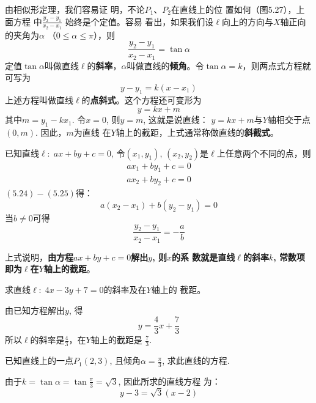 由相似形定理，我们容易证
明，不论$P_1$、$P_2$在直线上的位
置如何（图5.27），上面方程
中$\frac{y_2-y_1}{x_2-x_1}$
始终是个定值。容易
看出，如果我们设$\ell$向上的方向与$X$轴正向的夹角为$\alpha$
（$0\le \alpha\le \pi$），则
\[\frac{y_2-y_1}{x_2-x_1}=\tan\alpha\]
定值$\tan\alpha$叫做直线$\ell$的\textbf{斜率}，$\alpha$叫做直线的\textbf{倾角}。令$\tan\alpha=k$，则两点式方程就可写为
\[y-y_1=k(x-x_1)\]
上述方程叫做直线$\ell$的\textbf{点斜式}。这个方程还可变形为
\[y=kx+m\]
其中$m=y_1-kx_1$. 令$x=0$, 则$y=m$, 这就是说直线：
$y=kx+m$与$Y$轴相交于点$(0,m)$. 因此，$m$为直线
在$Y$轴上的截距，上式通常称做直线的\textbf{斜截式}。

已知直线$\ell:\; ax+by+c=0$, 令$(x_1,y_1)$, 
$(x_2,y_2)$是$\ell$上任意两个不同的点，则
\begin{align}
    ax_1+by_1+c=0\\
ax_2+by_2+c=0
\end{align}
$(5.24)-(5.25)$得：
\[a(x_2-x_1)+b(y_2-y_1)=0\]
当$b\ne 0$可得
\[\frac{y_2-y_1}{x_2-x_1}=-\frac{a}{b}\]

上式说明，\textbf{由方程$ax+by+c=0$解出$y$, 则$x$的系
数就是直线$\ell$的斜率$k$, 常数项即为$\ell$在$Y$轴上的截距}。

\begin{example}
    求直线$\ell:\; 4x-3y+7=0$的斜率及在$Y$轴上的
截距。
\end{example}


\begin{solution}
   由已知方程解出$y$, 得
\[y=\frac{4}{3}x+\frac{7}{3}\]
所以$\ell$的斜率是$\frac{4}{3}$，在$Y$轴上的截距是
$\frac{7}{3}$.
\end{solution}

\begin{example}
已知直线上的一点$P_1(2,3)$, 且倾角$\alpha=\frac{\pi}{3}$, 
求此直线的方程.
\end{example}

\begin{solution}
    由于$k=\tan\alpha=\tan\frac{\pi}{3}=\sqrt{3}$, 因此所求的直线方程
为：
\[y-3=\sqrt{3}(x-2)\]
\end{solution}

